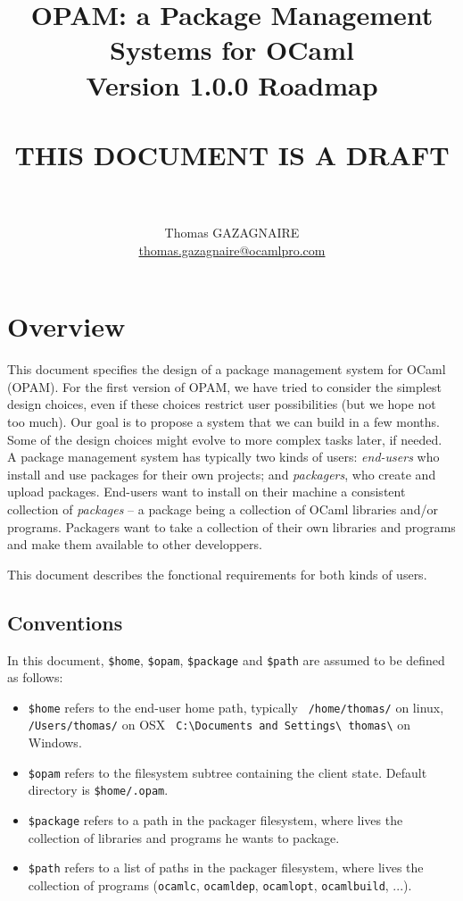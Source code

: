 \documentclass[a4paper,11pt]{article}
\title{
OPAM: a Package Management Systems for OCaml\\
Version 1.0.0 Roadmap\\ ~\ \\
THIS DOCUMENT IS A DRAFT\\
~\ \\}
\author{Thomas GAZAGNAIRE\\
\url{thomas.gazagnaire@ocamlpro.com}\\
}
\begin{document}
\maketitle

\vfill

\tableofcontents

\section*{Overview}

This document specifies the design of a package management system for
OCaml (OPAM). For the first version of OPAM, we have tried to consider
the simplest design choices, even if these choices restrict user
possibilities (but we hope not too much). Our goal is to propose a
system that we can build in a few months. Some of the design choices
might evolve to more complex tasks later, if needed. \\

A package management system has typically two kinds of users: {\em
  end-users} who install and use packages for their own projects; and
{\em packagers}, who create and upload packages. End-users want to
install on their machine a consistent collection of {\em packages} --
a package being a collection of OCaml libraries and/or programs.
Packagers want to take a collection of their own libraries and
programs and make them available to other developpers.

This document describes the fonctional requirements for both kinds of
users.

\subsection*{Conventions}

In this document, \verb+$home+, \verb+$opam+, \verb+$package+ and 
\verb+$path+ are assumed to be defined as follows:

\begin{itemize}

\item {\tt \$home} refers to the end-user home path, typically {\tt
  /home/thomas/} on linux, {\tt /Users/thomas/} on OSX {\tt
  C:\textbackslash Documents and Settings\textbackslash
  thomas\textbackslash} on Windows.

\item {\tt \$opam} refers to the filesystem subtree containing the
  client state. Default directory is {\tt \$home/.opam}.

\item {\tt \$package} refers to a path in the packager filesystem, where
  lives the collection of libraries and programs he wants to package.

\item {\tt \$path} refers to a list of paths in the packager filesystem, where
  lives the collection of programs ({\tt ocamlc}, {\tt ocamldep}, {\tt ocamlopt}, 
  {\tt ocamlbuild}, ...).

\end{itemize}
\end{document}
